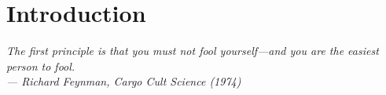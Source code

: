 \section{Introduction}
\label{sec:intro}

\begin{flushright}
\begin{minipage}{0.62\textwidth}
\raggedleft\small\itshape
The first principle is that you must not fool yourself---and you are the
easiest person to fool.\\[2pt]
\upshape--- Richard Feynman, \emph{Cargo Cult Science} (1974)
\end{minipage}
\end{flushright}
\vspace{4pt}


